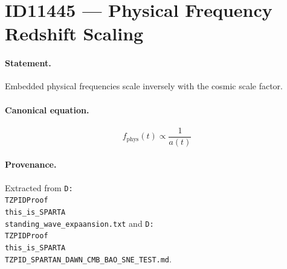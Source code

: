 \section*{ID11445 --- Physical Frequency Redshift Scaling}

\paragraph{Statement.}
Embedded physical frequencies scale inversely with the cosmic scale factor.

\paragraph{Canonical equation.}
\[
f_{\mathrm{phys}}(t)\propto\frac{1}{a(t)}
\]

\paragraph{Provenance.}
Extracted from \texttt{D:\\TZPIDProof\\this\_is\_SPARTA\\standing\_wave\_expaansion.txt} and \texttt{D:\\TZPIDProof\\this\_is\_SPARTA\\TZPID\_SPARTAN\_DAWN\_CMB\_BAO\_SNE\_TEST.md}.
